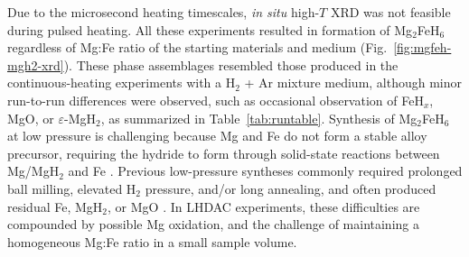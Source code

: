 \documentclass[draft,jgrga,12pt]{agujournal2019}
\begin{document}
Due to the microsecond heating timescales, \textit{in situ} high-$T$ XRD was not feasible during pulsed heating. 
All these experiments resulted in formation of Mg$_2$FeH$_6$ regardless of Mg:Fe ratio of the starting materials and medium (Fig.~\ref{fig:mgfeh-mgh2-xrd}). 
These phase assemblages resembled those produced in the continuous-heating experiments with a H$_2$ + Ar mixture medium, although minor run-to-run differences were observed, such as occasional observation of FeH$_x$, MgO, or $\varepsilon$-MgH$_2$, as summarized in Table~\ref{tab:runtable}.
Synthesis of Mg$_2$FeH$_6$ at low pressure is challenging  because Mg and Fe do not form a stable alloy precursor, requiring the hydride to form through solid-state reactions between Mg/MgH$_2$ and Fe \cite{puszkiel_new_2018}. 
Previous low-pressure syntheses commonly required prolonged ball milling, elevated H$_2$ pressure, and/or long annealing, and often produced residual Fe, MgH$_2$, or MgO \cite{wang_preparation_2010}. 
In LHDAC experiments, these difficulties are compounded by possible Mg oxidation, and the challenge of maintaining a homogeneous Mg:Fe ratio in a small sample volume. 




\end{document}
